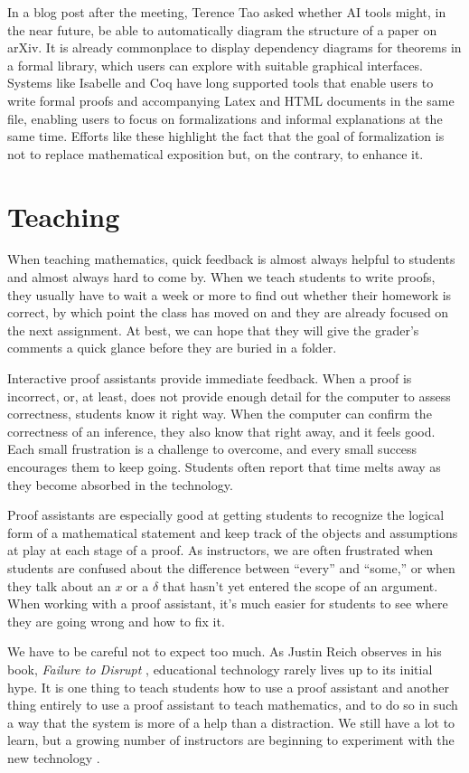 \documentclass[12pt]{amsart}
\theoremstyle{definition}
\theoremstyle{remark}
\numberwithin{equation}{section}
\begin{document}
In a blog post after the meeting, Terence Tao asked whether AI tools might, in the near future, be able to automatically diagram the structure of a paper on arXiv. It is already commonplace to display dependency diagrams for theorems in a formal library, which users can explore with suitable graphical interfaces. Systems like Isabelle and Coq have long supported tools that enable users to write formal proofs and accompanying Latex and HTML documents in the same file, enabling users to focus on formalizations and informal explanations at the same time. Efforts like these highlight the fact that the goal of formalization is not to replace mathematical exposition but, on the contrary, to enhance it.


\section{Teaching}

When teaching mathematics, quick feedback is almost always helpful to students and almost always hard to come by. When we teach students to write proofs, they usually have to wait a week or more to find out whether their homework is correct, by which point the class has moved on and they are already focused on the next assignment. At best, we can hope that they will give the grader's comments a quick glance before they are buried in a folder.

Interactive proof assistants provide immediate feedback. When a proof is incorrect, or, at least, does not provide enough detail for the computer to assess correctness, students know it right way. When the computer can confirm the correctness of an inference, they also know that right away, and it feels good. Each small frustration is a challenge to overcome, and every small success encourages them to keep going. Students often report that time melts away as they become absorbed in the technology.

Proof assistants are especially good at getting students to recognize the logical form of a mathematical statement and keep track of the objects and assumptions at play at each stage of a proof. As instructors, we are often frustrated when students are confused about the difference between ``every'' and ``some,'' or when they talk about an $x$ or a $\delta$ that hasn't yet entered the scope of an argument. When working with a proof assistant, it's much easier for students to see where they are going wrong and how to fix it.

We have to be careful not to expect too much. As Justin Reich observes in his book, \emph{Failure to Disrupt} \cite{reich:20}, educational technology rarely lives up to its initial hype. It is one thing to teach students how to use a proof assistant and another thing entirely to use a proof assistant to teach mathematics, and to do so in such a way that the system is more of a help than a distraction. We still have a lot to learn, but a growing number of instructors are beginning to experiment with the new technology \cite{kerjean:et:al:22}.
\end{document}
